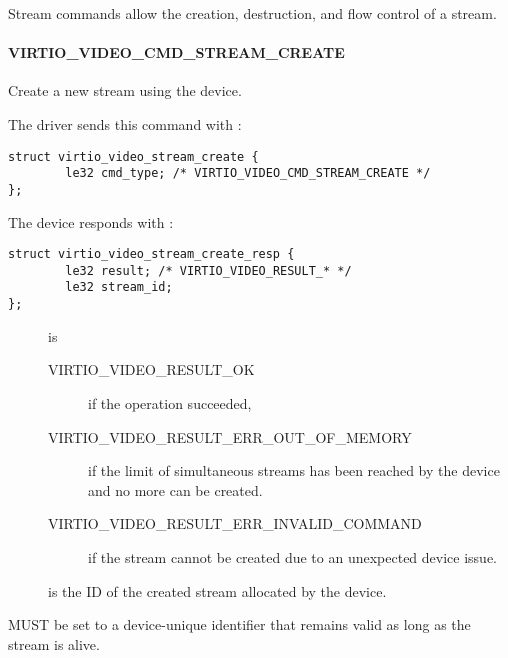 Stream commands allow the creation, destruction, and flow control of a
stream.

\paragraph{VIRTIO_VIDEO_CMD_STREAM_CREATE}\label{sec:Device Types / Video Device / Device Operation / Device Operation: Stream commands / VIRTIO_VIDEO_CMD_STREAM_CREATE}

Create a new stream using the device.

The driver sends this command with
:

\begin{lstlisting}
struct virtio_video_stream_create {
        le32 cmd_type; /* VIRTIO_VIDEO_CMD_STREAM_CREATE */
};
\end{lstlisting}

The device responds with :

\begin{lstlisting}
struct virtio_video_stream_create_resp {
        le32 result; /* VIRTIO_VIDEO_RESULT_* */
        le32 stream_id;
};
\end{lstlisting}

\begin{description}
\item[]
is

\begin{description}
\item[VIRTIO_VIDEO_RESULT_OK]
if the operation succeeded,
\item[VIRTIO_VIDEO_RESULT_ERR_OUT_OF_MEMORY]
if the limit of simultaneous streams has been reached by the device and
no more can be created.
\item[VIRTIO_VIDEO_RESULT_ERR_INVALID_COMMAND]
if the stream cannot be created due to an unexpected device issue.
\end{description}
\item[]
is the ID of the created stream allocated by the device.
\end{description}


 MUST be set to a device-unique identifier that remains
valid as long as the stream is alive.

